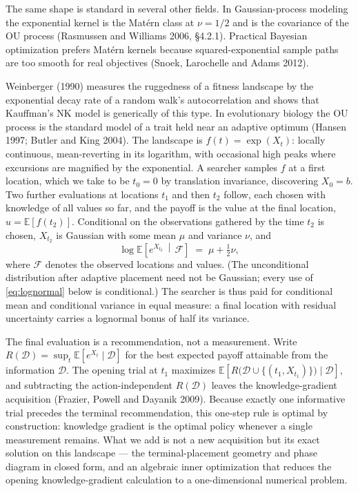 \documentclass[11pt]{article}
\theoremstyle{itheads}
\newcommand{\E}{\mathbb{E}}
\begin{document}
The same shape is standard in several other fields. In Gaussian-process
modeling the exponential kernel is the Mat\'ern class at $\nu=1/2$
and is the covariance of the OU process (Rasmussen and Williams
2006, \S4.2.1). Practical Bayesian optimization prefers Mat\'ern
kernels because squared-exponential sample paths are too smooth for
real objectives (Snoek, Larochelle and Adams 2012).

Weinberger (1990) measures the ruggedness of a fitness landscape by the
exponential decay rate of a random walk's autocorrelation and shows
that Kauffman's NK model is generically of this type. In
evolutionary biology the OU process is the standard model of a
trait held near an adaptive optimum (Hansen 1997; Butler and King
2004).
The landscape is $f(t)=\exp(X_t)$: locally continuous, mean-reverting in
its logarithm, with occasional high peaks where excursions are magnified
by the exponential. A searcher samples $f$ at a first location, which we
take to be $t_0=0$ by translation invariance, discovering $X_0=b$. Two
further evaluations at locations $t_1$ and then $t_2$ follow, each
chosen with knowledge of all values so far, and the payoff is the value
at the final location, $u=\E\left[f(t_2)\right]$. Conditional on the
observations gathered by the time $t_2$ is chosen, $X_{t_2}$ is
Gaussian with some mean $\mu$ and variance $\nu$, and
\begin{equation}\label{eq:lognormal}
\log \E\!\left[e^{X_{t_2}}\,\middle|\,\mathcal{F}\right]
\;=\; \mu + \tfrac{1}{2}\nu ,
\end{equation}
where $\mathcal{F}$ denotes the observed locations and values. (The
unconditional distribution after adaptive placement need not be
Gaussian; every use of \eqref{eq:lognormal} below is conditional.) The
searcher is thus paid for conditional mean and conditional variance in
equal measure: a final location with residual uncertainty carries a
lognormal bonus of half its variance.

The final evaluation is a recommendation, not a measurement. Write
$R(\mathcal{D})=\sup_t \E[e^{X_t}\mid\mathcal{D}]$ for the best
expected payoff attainable from the information $\mathcal{D}$. The
opening trial at $t_1$ maximizes
$\E\!\left[R\bigl(\mathcal{D}\cup\{(t_1,X_{t_1})\}\bigr)\mid
\mathcal{D}\right]$, and subtracting the action-independent
$R(\mathcal{D})$ leaves the knowledge-gradient acquisition (Frazier,
Powell and Dayanik 2009). Because exactly one informative trial
precedes the terminal recommendation, this one-step rule is optimal by
construction: knowledge gradient is the optimal policy whenever a
single measurement remains. What we add is not a new acquisition but
its exact solution on this landscape --- the terminal-placement
geometry and phase diagram in closed form, and an algebraic inner
optimization that reduces the opening knowledge-gradient calculation to
a one-dimensional numerical problem.
\end{document}
